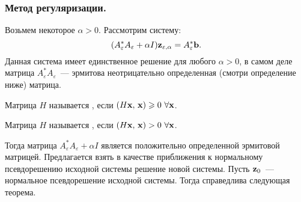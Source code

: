 \subsubsection{Метод регуляризации.}
Возьмем некоторое $\alpha>0$. Рассмотрим систему:
\[
    (A^*_{\varepsilon}A_{\varepsilon}+\alpha I)\mathbf{z}_{\varepsilon,\alpha}=A_{\varepsilon}^{*}\mathbf{b}.    
\]
Данная система имеет единственное решение для любого $\alpha>0$, в самом деле матрица $A^*_{\varepsilon}A_{\varepsilon}$~--- эрмитова неотрицательно 
определенная (смотри определение ниже) матрица. 

\begin{definition}
    Матрица $H$ называется , если $(H\mathbf{x},\, \mathbf{x})\geqslant 0\ \forall\mathbf{x}$.
\end{definition}

\begin{definition}
    Матрица $H$ называется , если $(H\mathbf{x},\, \mathbf{x})> 0\ \forall\mathbf{x}$.
\end{definition}

Тогда матрица $A^*_{\varepsilon}A_{\varepsilon}+\alpha I$ является положительно определенной эрмитовой матрицей. 
Предлагается взять в качестве приближения к нормальному псевдорешению исходной системы решение новой системы.
Пусть $\mathbf{z}_0$~--- нормальное псевдорешение исходной системы. Тогда справедлива следующая теорема.

